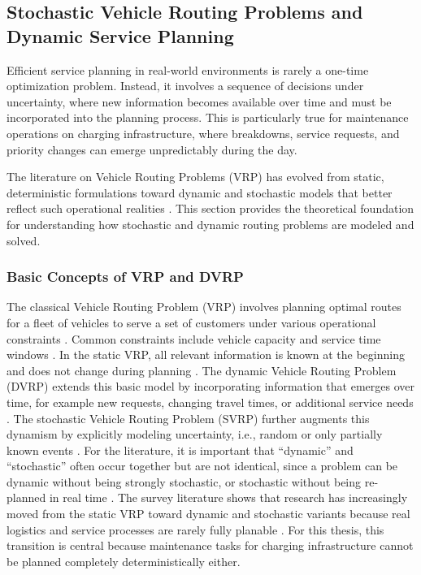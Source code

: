 \documentclass[12pt,oneside]{article}
\begin{document}
\subsection{Stochastic Vehicle Routing Problems and Dynamic Service Planning}\label{subsec_stochastic_vehicle_routing_problems_and_dynamic_service_planning}
Efficient service planning in real-world environments is rarely a one-time optimization problem. Instead, it involves a sequence of decisions under uncertainty, where new information becomes available over time and must be incorporated into the planning process. This is particularly true for maintenance operations on charging infrastructure, where breakdowns, service requests, and priority changes can emerge unpredictably during the day.

The literature on Vehicle Routing Problems (VRP) has evolved from static, deterministic formulations toward dynamic and stochastic models that better reflect such operational realities \citep{ritzinger2016survey}. This section provides the theoretical foundation for understanding how stochastic and dynamic routing problems are modeled and solved.


\subsubsection{Basic Concepts of VRP and DVRP}
The classical Vehicle Routing Problem (VRP) involves planning optimal routes for a fleet of vehicles to serve a set of customers under various operational constraints \citep{pillac2013review}. Common constraints include vehicle capacity and service time windows \citep{hildebrandt2023opportunities}. In the static VRP, all relevant information is known at the beginning and does not change during planning \citep{ritzinger2016survey}. The dynamic Vehicle Routing Problem (DVRP) extends this basic model by incorporating information that emerges over time, for example new requests, changing travel times, or additional service needs \citep{abbatecola2016review}.
The stochastic Vehicle Routing Problem (SVRP) further augments this dynamism by explicitly modeling uncertainty, i.e., random or only partially known events \citep{akhmetbek2023stochastic}. For the literature, it is important that “dynamic” and “stochastic” often occur together but are not identical, since a problem can be dynamic without being strongly stochastic, or stochastic without being re-planned in real time \citep{ritzinger2016survey}. The survey literature shows that research has increasingly moved from the static VRP toward dynamic and stochastic variants because real logistics and service processes are rarely fully planable \citep{mardevsic2023review}.
For this thesis, this transition is central because maintenance tasks for charging infrastructure cannot be planned completely deterministically either.
\end{document}
